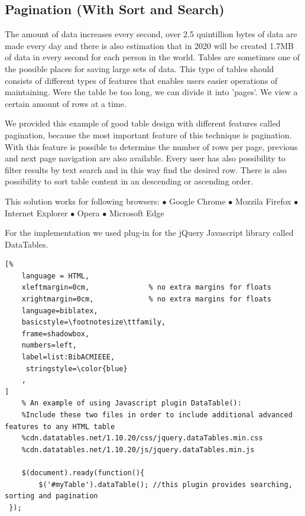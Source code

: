 \subsection{Pagination (With Sort and Search)}
The amount of data increases every second, over 2.5 quintillion bytes of data are made every day and there is also estimation that in 2020 will be created 1.7MB of data in every second for each person in the world\parencite{PG_2}. 
\newline 
Tables are sometimes one of the possible places for saving large sets of data.
This type of tables should consists of different types of features that enables users easier operations of maintaining.
\newline
Were the table be too long, we can divide it into 'pages'. We view a certain amount of rows at a time.
\newline

We provided this example of good table design with different features called pagination, because the most important feature of this technique is pagination.
With this feature is possible to determine the number of rows per page, previous  and next page navigation are also available. 
Every user has also possibility to filter results by text search and in this way find the desired row.
There is also possibility to sort table content in an descending or ascending order.

This solution works for following browsers:
\newline $\bullet$ Google Chrome
\newline $\bullet$ Mozzila Firefox
\newline $\bullet$ Internet Explorer
\newline $\bullet$ Opera
\newline $\bullet$ Microsoft Edge

For the implementation we used plug-in for the jQuery Javascript library called DataTables\parencite{PG_1}.


\begin{lstlisting}[%
    language = HTML, 
    xleftmargin=0cm,              % no extra margins for floats
    xrightmargin=0cm,             % no extra margins for floats
    language=biblatex,
    basicstyle=\footnotesize\ttfamily,
    frame=shadowbox,
    numbers=left,
    label=list:BibACMIEEE,
     stringstyle=\color{blue}
    ,
]
    % An example of using Javascript plugin DataTable():
    %Include these two files in order to include additional advanced features to any HTML table
    %cdn.datatables.net/1.10.20/css/jquery.dataTables.min.css
    %cdn.datatables.net/1.10.20/js/jquery.dataTables.min.js

    $(document).ready(function(){
        $('#myTable').dataTable(); //this plugin provides searching, sorting and pagination
 });

\end{lstlisting}

